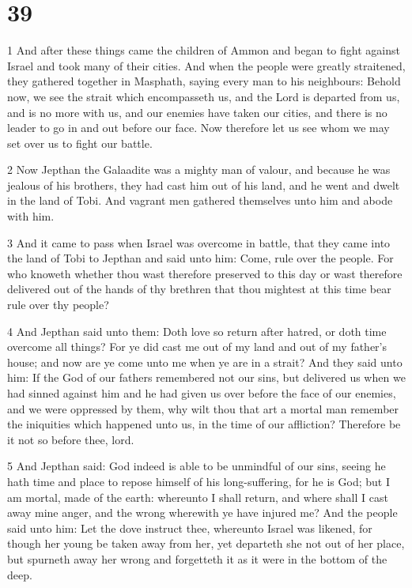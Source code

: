 \chapter{39}

\par 1 And after these things came the children of Ammon and began to fight against Israel and took many of their cities. And when the people were greatly straitened, they gathered together in Masphath, saying every man to his neighbours: Behold now, we see the strait which encompasseth us, and the Lord is departed from us, and is no more with us, and our enemies have taken our cities, and there is no leader to go in and out before our face. Now therefore let us see whom we may set over us to fight our battle.

\par 2 Now Jepthan the Galaadite was a mighty man of valour, and because he was jealous of his brothers, they had cast him out of his land, and he went and dwelt in the land of Tobi. And vagrant men gathered themselves unto him and abode with him.

\par 3 And it came to pass when Israel was overcome in battle, that they came into the land of Tobi to Jepthan and said unto him: Come, rule over the people. For who knoweth whether thou wast therefore preserved to this day or wast therefore delivered out of the hands of thy brethren that thou mightest at this time bear rule over thy people? 

\par 4 And Jepthan said unto them: Doth love so return after hatred, or doth time overcome all things? For ye did cast me out of my land and out of my father's house; and now are ye come unto me when ye are in a strait? And they said unto him: If the God of our fathers remembered not our sins, but delivered us when we had sinned against him and he had given us over before the face of our enemies, and we were oppressed by them, why wilt thou that art a mortal man remember the iniquities which happened unto us, in the time of our affliction? Therefore be it not so before thee, lord. 

\par 5 And Jepthan said: God indeed is able to be unmindful of our sins, seeing he hath time and place to repose himself of his long-suffering, for he is God; but I am mortal, made of the earth: whereunto I shall return, and where shall I cast away mine anger, and the wrong wherewith ye have injured me? And the people said unto him: Let the dove instruct thee, whereunto Israel was likened, for though her young be taken away from her, yet departeth she not out of her place, but spurneth away her wrong and forgetteth it as it were in the bottom of the deep.


